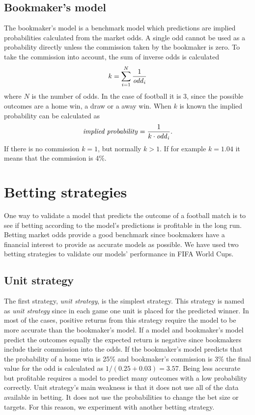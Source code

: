\subsection{Bookmaker's model}
The bookmaker's model is a benchmark model which predictions are implied probabilities calculated from the market odds. A single odd cannot be used as a probability directly unless the commission taken by the bookmaker is zero. To take the commission into account, the sum of inverse odds is calculated
\begin{equation}
    k = \sum_{i=1}^{N}\frac{1}{\text{\textit{odd}}_i}
\end{equation}
where $N$ is the number of odds. In the case of football it is 3, since the possible outcomes are a home win,  a draw or a away win.
When $k$ is known the implied probability can be calculated as
\begin{equation}
    \text{\textit{implied probability}} = \frac{1}{k \cdot \text{\textit{odd}}_i}\text{.}
\end{equation}
If there is no commission $k=1$, but normally $k>1$. If for example $k=1.04$ it means that the commission is 4\%.

\section{Betting strategies}
One way to validate a model that predicts the outcome of a football match is to see if betting according to the model's predictions is profitable in the long run. Betting market odds provide a good benchmark since bookmakers have a financial interest to provide as accurate models as possible. We have used two betting strategies to validate our models' performance in FIFA World Cups.

\subsection{Unit strategy}
The first strategy, \textit{unit strategy}, is the simplest strategy. This strategy is named as \textit{unit strategy} since in each game one unit is placed for the predicted winner. In most of the cases, positive returns from this strategy require the model to be more accurate than the bookmaker's model. If a model and bookmaker's model predict the outcomes equally the expected return is negative since bookmakers include their commission into the odds. If the bookmaker's model predicts that the probability of a home win is 25\% and bookmaker's commission is 3\% the final value for the odd is calculated as $1/(0.25+0.03) = 3.57$. Being less accurate but profitable requires a model to predict many outcomes with a low probability correctly. Unit strategy's main weakness is that it does not use all of the data available in betting. It does not use the probabilities to change the bet size or targets. For this reason, we experiment with another betting strategy.

